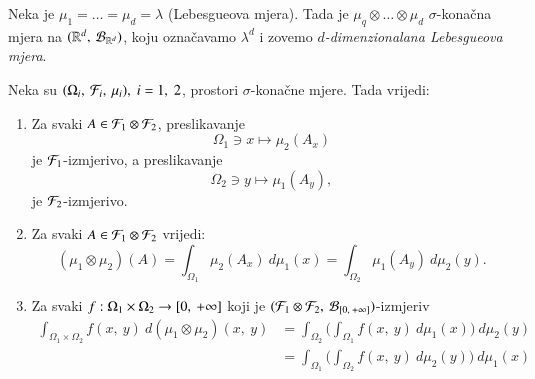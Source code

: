 \begin{pr}  \label{pr:4.13}
    Neka je $\mu_1 = \ldots = \mu_d = \lambda$ (Lebesgueova mjera).
    Tada je $\mu_q \otimes \ldots \otimes \mu_d$ $\sigma$-kona\v cna mjera na $({\mathbb{R}^d}, \: {\mathcal{B}_{\mathbb{R}^d}})$, koju ozna\v cavamo $\lambda^d$ i zovemo \emph{$d$-dimenzionalana Lebesgueova mjera}.
\end{pr}

\begin{zad} \label{zad:4.15}
    Neka su $(\Omega_i, \: \mathcal{F}_i, \: \mu_i), \; i = 1, \; 2$, prostori $\sigma$-kona\v cne mjere.
    Tada vrijedi:
    \begin{enumerate}[label=(\roman*)]
        \item Za svaki $A \in \mathcal{F}_1 \otimes \mathcal{F}_2$, preslikavanje
        \begin{equation*}
            \Omega_1 \ni x \mapsto \mu_2 (A_x)
        \end{equation*}
        je $\mathcal{F}_1$-izmjerivo, a preslikavanje
        \begin{equation*}
            \Omega_2 \ni y \mapsto \mu_1 (A_y),
        \end{equation*}
        je $\mathcal{F}_2$-izmjerivo.
        \item Za svaki $A \in \mathcal{F}_1 \otimes \mathcal{F}_2$ vrijedi:
        \begin{equation*}
            (\mu_1 \otimes \mu_2) (A) = \int_{\Omega_1} \mu_2 (A_x) \: d \mu_1(x) = \int_{\Omega_2} \mu_1 (A_y) \: d \mu_2 (y).
        \end{equation*}
        \item Za svaki $f: \Omega_1 \times \Omega_2 \to [{0}, \:{+\infty}]$ koji je $({\mathcal{F}_1 \otimes \mathcal{F}_2}, \: {\mathcal{B}_{[{0}, \:{+\infty}]}})$-izmjeriv
        \begin{align*}
            \int_{\Omega_1 \times \Omega_2} f(x, \: y) \: d (\mu_1 \otimes \mu_2)(x, \:y) &= \int_{\Omega_2} \Big( \int_{\Omega_1} f(x, \: y) \: d \mu_1 (x) \Big) \: d \mu_2 (y)\\
            &= \int_{\Omega_1} \Big( \int_{\Omega_2} f(x, \: y) \: d \mu_2 (y) \Big) \: d \mu_1 (x)
        \end{align*}
    \end{enumerate} 
\end{zad}

